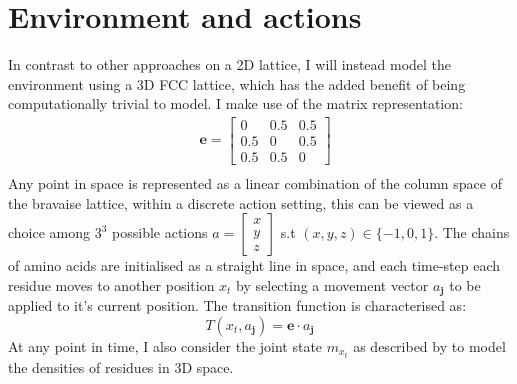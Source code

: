 \section{Environment and actions}
In contrast to other approaches on a 2D lattice, I will instead 
model the environment using a 3D FCC lattice, which has the added benefit of
being computationally trivial to model. I make use of the
matrix representation:
\begin{equation}
    \begin{split}
        & \mathbf{e} = \begin{bmatrix}
            0 & 0.5 & 0.5 \\
            0.5 & 0 & 0.5 \\
            0.5 & 0.5 & 0
        \end{bmatrix} \\
    \end{split}
\end{equation}
Any point in space is represented as a linear combination of the
column space of the bravaise lattice, within a discrete action setting,
this can be viewed as a choice among $3^3$ possible actions $ a = \begin{bmatrix}
    x \\ y \\ z
\end{bmatrix}$ s.t $(x,y,z) \in \{-1,0,1 \}$.
The chains of amino acids are initialised as a straight line in space, and each
time-step each residue moves to another position $x_t$ by selecting a movement vector
$a_{\mathbf{j}}$ to be applied to it's current position. The transition function
is characterised as:
\begin{equation}
    T(x_t, a_{\mathbf{j}}) =\mathbf{e} \cdot a_{\mathbf{j}}
\end{equation}
At any point in time, I also consider the joint state $m_{x_t}$ as described by \cite{Mguni2018}
to model the densities of residues in 3D space.

